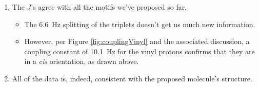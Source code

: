 \documentclass[../notes.tex]{subfiles}
\begin{document}
\begin{itemize}
\begin{enumerate}
        \item The $J$'s agree with all the motifs we've proposed so far.
        \begin{itemize}
            \item The \SI{6.6}{\hertz} splitting of the triplets doesn't get us much new information.
            \item However, per Figure \ref{fig:couplingVinyl} and the associated discussion, a coupling constant of \SI{10.1}{\hertz} for the vinyl protons confirms that they are in a \emph{cis} orientation, as drawn above.
        \end{itemize}
        \item All of the data is, indeed, consistent with the proposed molecule's structure.
    \end{enumerate}
\end{itemize}
\end{document}
